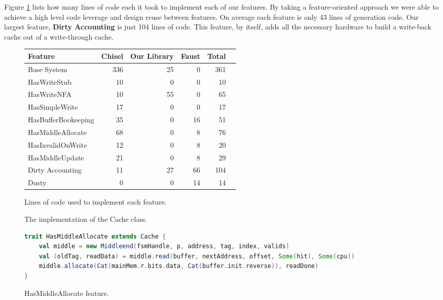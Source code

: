 \documentclass[conference]{IEEEtran}
\begin{document}
Figure \ref{fig:LOC} lists how many lines of code each it took to implement each of our features. By taking a feature-oriented approach we were able to achieve a high level code leverage and design reuse between features. On average each feature is only 43 lines of generation code. Our largest feature, \textbf{Dirty Accounting} is just 104 lines of code. This feature, by itself, adds all the necessary hardware to build a write-back cache out of a write-through cache.

\begin{figure}[ht]
    \centering
\scriptsize
\begin{tabular}{lrrrrr}\toprule
Feature &Chisel &Our Library &Faust &Total \\\midrule
Base System &336 &25 &0 &361 \\
HasWriteStub &10 &0 &0 &10 \\
HasWriteNFA &10 &55 &0 &65 \\
HasSimpleWrite &17 &0 &0 &17 \\
HasBufferBookeeping &35 &0 &16 &51 \\
HasMiddleAllocate &68 &0 &8 &76 \\
HasInvalidOnWrite &12 &0 &8 &20 \\
HasMiddleUpdate &21 &0 &8 &29 \\
Dirty Accounting &11 &27 &66 &104 \\
Dusty &0 &0 &14 &14 \\
\bottomrule
\end{tabular}
    \caption{Lines of code used to implement each feature.}
    \label{fig:LOC}
\end{figure}

\begin{figure}[ht]
    \centering
    
    \caption{The implementation of the Cache class.}
    \label{lst:BaseSystem}
\end{figure}

\begin{figure}[ht]
    \centering
    \begin{lstlisting}[language = Scala]
trait HasMiddleAllocate extends Cache {
    val middle = new Middleend(fsmHandle, p, address, tag, index, valids)
    val (oldTag, readData) = middle.read(buffer, nextAddress, offset, Some(hit), Some(cpu))
    middle.allocate(Cat(mainMem.r.bits.data, Cat(buffer.init.reverse)), readDone)
}
    \end{lstlisting}
    \caption{HasMiddleAllocate feature.}
    \label{fig:HasMiddleAllocate}
\end{figure}
\end{document}
